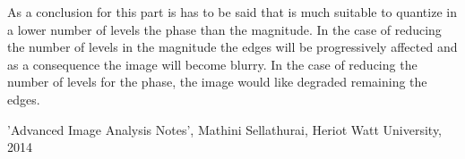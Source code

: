 \documentclass[a4paper, 10pt, conference] {article}
\begin{document}
  As a conclusion for this part is has to be said that is much suitable to quantize in a lower number of levels the phase than the magnitude. In the case of reducing the number of levels in the magnitude the edges will be progressively affected and as a consequence the image will become blurry. In the case of reducing the number of levels for the phase, the image would like degraded remaining the edges.
  
\begin{thebibliography}{99}

'Advanced Image Analysis Notes', Mathini Sellathurai, Heriot Watt University, 2014
\end{thebibliography}
\end{document}
